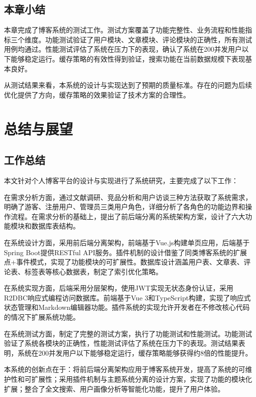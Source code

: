 \documentclass[UTF8,AutoFakeBold=1,AutoFakeSlant,zihao=-4]{SCAU}
\begin{document}
 \subsection{本章小结}

 本章完成了博客系统的测试工作。测试方案覆盖了功能完整性、业务流程和性能指标三个维度。功能测试验证了用户模块、文章模块、评论模块的正确性，所有测试用例均通过。性能测试评估了系统在压力下的表现，确认了系统在200并发用户以下能够稳定运行。缓存策略的有效性得到验证，搜索功能在当前数据规模下表现基本良好。

 从测试结果来看，本系统的设计与实现达到了预期的质量标准。存在的问题为后续优化提供了方向，缓存策略的效果验证了技术方案的合理性。

 \section{总结与展望}

 \subsection{工作总结}

 本文针对个人博客平台的设计与实现进行了系统研究，主要完成了以下工作：

在需求分析方面，通过文献调研、竞品分析和用户访谈三种方法获取了系统需求，明确了游客、注册用户、管理员三类用户角色，详细分析了各角色的功能边界和操作流程。在需求分析的基础上，提出了前后端分离的系统架构方案，设计了六大功能模块和数据库表结构。

在系统设计方面，采用前后端分离架构，前端基于Vue.js构建单页应用，后端基于Spring Boot提供RESTful API服务。插件机制的设计借鉴了同类博客系统的扩展点+事件模式，实现了功能模块的可扩展性。数据库设计涵盖用户表、文章表、评论表、标签表等核心数据表，制定了索引优化策略。

在系统实现方面，后端采用分层架构，使用JWT实现无状态身份认证，采用R2DBC响应式编程访问数据库。前端基于Vue 3和TypeScript构建，实现了响应式状态管理和Markdown编辑器功能。插件系统的实现允许开发者在不修改核心代码的情况下扩展系统功能。

在系统测试方面，制定了完整的测试方案，执行了功能测试和性能测试。功能测试验证了系统各模块的正确性，性能测试评估了系统在压力下的表现。测试结果表明，系统在200并发用户以下能够稳定运行，缓存策略能够获得约8倍的性能提升。

 本系统的创新点在于：将前后端分离架构应用于博客系统开发，提高了系统的可维护性和可扩展性；采用插件机制与主题系统分离的设计方案，实现了功能的模块化扩展；整合了全文搜索、用户画像分析等智能化功能，提升了用户体验。
\end{document}
